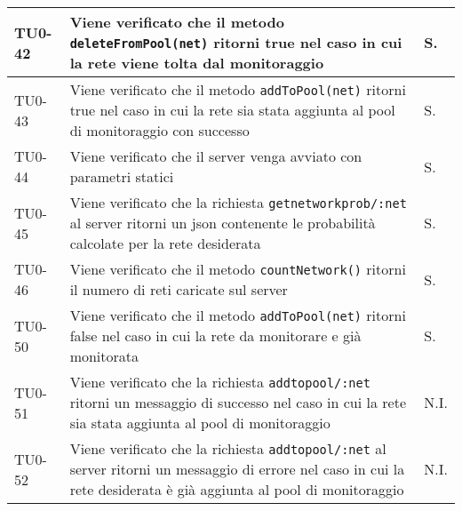 \begin{longtable}{|C{.15\textwidth}|m{.66\textwidth}|C{.10\textwidth}|}
\hline 
 TU0-42 & Viene verificato che il metodo \texttt{deleteFromPool(net)} ritorni true nel caso in cui la rete viene tolta dal monitoraggio & S. \\ 
 \hline
{} TU0-43 & Viene verificato che il metodo \texttt{addToPool(net)} ritorni true nel caso in cui la rete sia stata aggiunta al pool di monitoraggio con successo & S. \\ 
\hline
TU0-44 & Viene verificato che il server venga avviato con parametri statici & S. \\ 
\hline
{}TU0-45 & Viene verificato che la richiesta \texttt{getnetworkprob/:net} al server ritorni un json contenente le probabilità calcolate per la rete desiderata & S. \\ 
\hline 
TU0-46 & Viene verificato che il metodo \texttt{countNetwork()} ritorni il numero di reti caricate sul server & S. \\ 
\hline 
TU0-50 & Viene verificato che il metodo \texttt{addToPool(net)} ritorni false nel caso in cui la rete da monitorare e già monitorata & S. \\ 
\hline
{} TU0-51 & Viene verificato che la richiesta \texttt{addtopool/:net} ritorni un messaggio di successo nel caso in cui la rete sia stata aggiunta al pool di monitoraggio & N.I. \\ 
\hline 
TU0-52 & Viene verificato che la richiesta \texttt{addtopool/:net} al server ritorni un messaggio di errore nel caso in cui la rete desiderata è già aggiunta al pool di monitoraggio & N.I. \\ 
\hline


\end{longtable}
